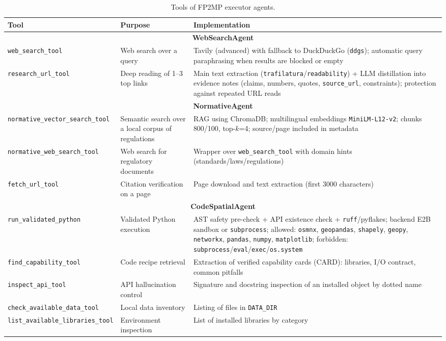 \begin{table}[ht]
\centering
\footnotesize
\begin{tabularx}{\textwidth}{l | X X}
\hline
\textbf{Tool} & \textbf{Purpose} & \textbf{Implementation} \\
\midrule
\multicolumn{3}{c}{\textbf{WebSearchAgent}}\\
\midrule
\texttt{web\_search\_tool}   & Web search over a query & Tavily (advanced) with fallback to DuckDuckGo (\texttt{ddgs}); automatic query paraphrasing when results are blocked or empty \\[2pt]
\texttt{research\_url\_tool}  & Deep reading of 1--3 top links & Main text extraction (\texttt{trafilatura}/\texttt{readability}) + LLM distillation into evidence notes (claims, numbers, quotes, \texttt{source\_url}, constraints); protection against repeated URL reads \\
\midrule
\multicolumn{3}{c}{\textbf{NormativeAgent}}\\
\midrule
\texttt{normative\_vector\_search\_tool} & Semantic search over a local corpus of regulations & RAG using ChromaDB; multilingual embeddings \texttt{MiniLM-L12-v2}; chunks 800/100, top-$k$=4; source/page included in metadata \\[2pt]
\texttt{normative\_web\_search\_tool}    & Web search for regulatory documents & Wrapper over \texttt{web\_search\_tool} with domain hints (standards/laws/regulations) \\[2pt]
\texttt{fetch\_url\_tool}                 & Citation verification on a page & Page download and text extraction (first 3000 characters) \\
\midrule
\multicolumn{3}{c}{\textbf{CodeSpatialAgent}}\\
\midrule
\texttt{run\_validated\_python}        & Validated Python execution & AST safety pre-check + API existence check + \texttt{ruff}/pyflakes; backend E2B sandbox or \texttt{subprocess}; allowed: \texttt{osmnx}, \texttt{geopandas}, \texttt{shapely}, \texttt{geopy}, \texttt{networkx}, \texttt{pandas}, \texttt{numpy}, \texttt{matplotlib}; forbidden: \texttt{subprocess}/\texttt{eval}/\texttt{exec}/\texttt{os.system} \\[2pt]
\texttt{find\_capability\_tool}        & Code recipe retrieval & Extraction of verified capability cards (CARD): libraries, I/O contract, common pitfalls \\[2pt]
\texttt{inspect\_api\_tool}            & API hallucination control & Signature and docstring inspection of an installed object by dotted name \\[2pt]
\texttt{check\_available\_data\_tool}  & Local data inventory & Listing of files in \texttt{DATA\_DIR} \\[2pt]
\texttt{list\_available\_libraries\_tool} & Environment inspection & List of installed libraries by category \\
\hline
\end{tabularx}
\caption{Tools of FP2MP executor agents.}
\label{table:tools}
\end{table}

